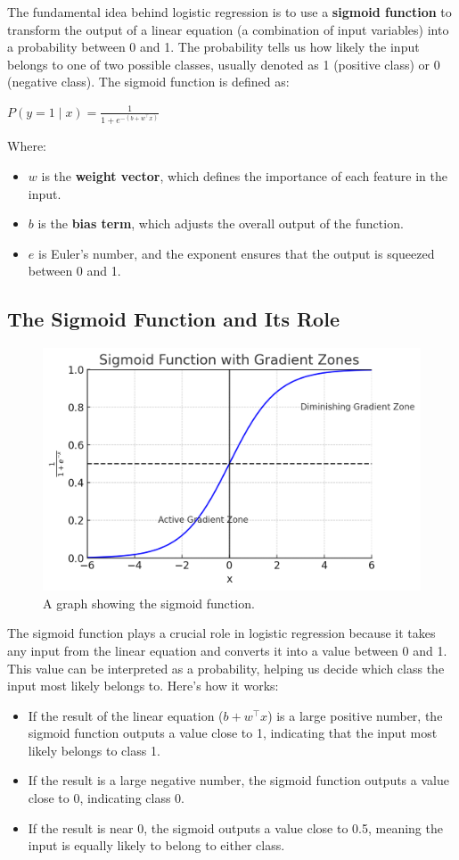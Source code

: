     The fundamental idea behind logistic regression is to use a \textbf{sigmoid function} to transform the output of a linear equation (a combination of input variables) into a probability between 0 and 1. The probability tells us how likely the input belongs to one of two possible classes, usually denoted as 1 (positive class) or 0 (negative class). The sigmoid function is defined as:

    \begin{center}
        \( P(y=1 \mid x) = \frac{1}{1 + e^{-(b + w^{\top}x)}} \)
    \end{center}
    
    Where:
    \begin{itemize}
        \item \( w \) is the \textbf{weight vector}, which defines the importance of each feature in the input.
        \item \( b \) is the \textbf{bias term}, which adjusts the overall output of the function.
        \item \( e \) is Euler’s number, and the exponent ensures that the output is squeezed between 0 and 1.
    \end{itemize}

\subsection{The Sigmoid Function and Its Role}
    \begin{figure}[H]
        \centering
        \includegraphics[width=0.45\linewidth]{ml/sigmoid_function.png}
        \caption{A graph showing the sigmoid function.}
        \label{fig:sigmoid_function}
    \end{figure}
    
    \large The sigmoid function plays a crucial role in logistic regression because it takes any input from the linear equation and converts it into a value between 0 and 1. This value can be interpreted as a probability, helping us decide which class the input most likely belongs to. Here's how it works:
    
    \begin{itemize}
        \item If the result of the linear equation (\( b + w^{\top}x \)) is a large positive number, the sigmoid function outputs a value close to 1, indicating that the input most likely belongs to class 1.
        \item If the result is a large negative number, the sigmoid function outputs a value close to 0, indicating class 0.
        \item If the result is near 0, the sigmoid outputs a value close to 0.5, meaning the input is equally likely to belong to either class.
    \end{itemize}
    
